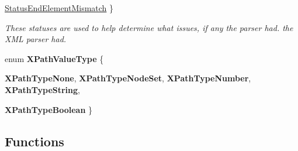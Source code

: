 \begin{DoxyCompactItemize}
\hyperlink{namespacephys_1_1xml_ae7aabb879b21c73d8183a54470f8917fa6b8d817142e0898ad9b1c61cfa54b8ea}{StatusEndElementMismatch}
 \}
\begin{DoxyCompactList}\small\item\em These statuses are used to help determine what issues, if any the parser had. the XML parser had. \item\end{DoxyCompactList}\item 
enum {\bfseries XPathValueType} \{ \par
{\bfseries XPathTypeNone}, 
{\bfseries XPathTypeNodeSet}, 
{\bfseries XPathTypeNumber}, 
{\bfseries XPathTypeString}, 
\par
{\bfseries XPathTypeBoolean}
 \}
\end{DoxyCompactItemize}
\subsection*{Functions}
